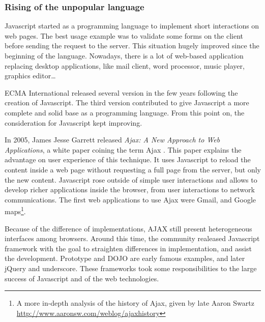 \subsubsection{Rising of the unpopular language}

Javascript started as a programming language to implement short interactions on web pages.
The best usage example was to validate some forms on the client before sending the request to the server.
This situation hugely improved since the beginning of the language.
Nowadays, there is a lot of web-based application replacing desktop applications, like mail client, word processor, music player, graphics editor…


ECMA International released several version in the few years following the creation of Javascript.
The third version %
contributed to give Javascript a more complete and solid base as a programming language.
From this point on, the consideration for Javascript kept improving.

In 2005, James Jesse Garrett released \textit{Ajax: A New Approach to Web Applications}, a white paper coining the term Ajax \cite{Garrett2005}.
This paper explains the advantage on user experience of this technique.
It uses Javascript to reload the content inside a web page without requesting a full page from the server, but only the new content.
Javascript rose outside of simple user interactions and allows to develop richer applications inside the browser, from user interactions to network communications.
The first web applications to use Ajax were Gmail, and Google maps\footnote{A more in-depth analysis of the history of Ajax, given by late Aaron Swartz \url{http://www.aaronsw.com/weblog/ajaxhistory}}.

Because of the difference of implementations, AJAX still present heterogeneous interfaces among browsers.
Around this time, the community realeased Javascript framework with the goal to straighten differences in implementation, and assist the development.
Prototype and DOJO are early famous examples, and later jQuery and underscore.
These frameworks took some responsibilities to the large success of Javascript and of the web technologies.

